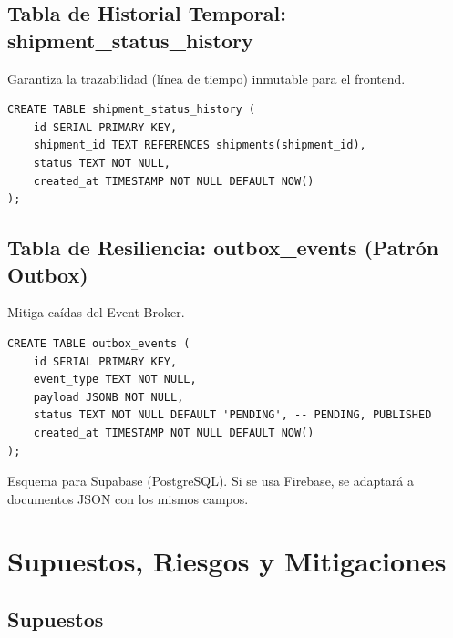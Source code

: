 \documentclass[11pt, a4paper]{article}
\begin{document}
\subsection{Tabla de Historial Temporal: shipment\_status\_history}
Garantiza la trazabilidad (línea de tiempo) inmutable para el frontend.

\begin{lstlisting}
CREATE TABLE shipment_status_history (
    id SERIAL PRIMARY KEY,
    shipment_id TEXT REFERENCES shipments(shipment_id),
    status TEXT NOT NULL,
    created_at TIMESTAMP NOT NULL DEFAULT NOW()
);
\end{lstlisting}

\subsection{Tabla de Resiliencia: outbox\_events (Patrón Outbox)}
Mitiga caídas del Event Broker.

\begin{lstlisting}
CREATE TABLE outbox_events (
    id SERIAL PRIMARY KEY,
    event_type TEXT NOT NULL,
    payload JSONB NOT NULL,
    status TEXT NOT NULL DEFAULT 'PENDING', -- PENDING, PUBLISHED
    created_at TIMESTAMP NOT NULL DEFAULT NOW()
);
\end{lstlisting}

\begin{infobox}
  Esquema para Supabase (PostgreSQL). Si se usa Firebase,
  se adaptará a documentos JSON con los mismos campos.
\end{infobox}


\section{Supuestos, Riesgos y Mitigaciones}

\subsection{Supuestos}
\end{document}
